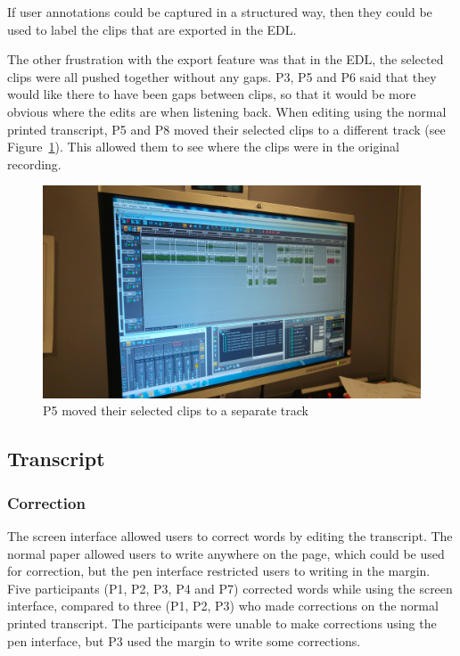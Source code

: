 If user annotations could be captured in a structured way, then they could be used to label the clips that are exported
in the EDL.

The other frustration with the export feature was that in the EDL, the selected clips were all pushed together without
any gaps. P3, P5 and P6 said that they would like there to have been gaps between clips, so that it would be more
obvious where the edits are when listening back. When editing using the normal printed transcript, P5 and P8 moved
their selected clips to a different track (see Figure~\ref{fig:p5-screen}). This allowed them to see where the clips
were in the original recording.

\begin{figure}[h]
  \centering
  \includegraphics[width=\columnwidth]{figs/pen-screen-p5.jpg}
  \caption{P5 moved their selected clips to a separate track}
  \label{fig:p5-screen}
\end{figure}


\subsection{Transcript}

\subsubsection{Correction}


The screen interface allowed users to correct words by editing the transcript. The normal paper allowed users to write
anywhere on the page, which could be used for correction, but the pen interface restricted users to writing in the
margin.  Five participants (P1, P2, P3, P4 and P7) corrected words while using the screen interface, compared to three
(P1, P2, P3) who made corrections on the normal printed transcript. The participants were unable to make corrections
using the pen interface, but P3 used the margin to write some corrections. 

